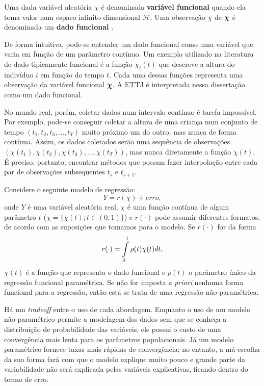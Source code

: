 \documentclass[
	12pt,				%
	openright,			%
	oneside,			%
	a4paper,			%
	english,			%
	brazil				%
	]{dissertacao-ufrgs-abntex2}
\begin{document}
Uma dada variável aleatória $\chi$ é denominada \textbf{variável
funcional }quando ela toma valor num espaco infinito dimensional $\mathcal{H}$.
Uma observação $\chi$ de $\mathcal{\boldsymbol{\chi}}$ é denominada um \textbf{dado
funcional} \cite{vieu_nonparametric_2006}.

De forma intuitiva, pode-se entender um dado funcional como uma variável
que varia em função de um parâmetro contínuo. Um exemplo utilizado
na literatura de dado tipicamente funcional é a função $\chi_{i}(t)$
que descreve a altura do indivíduo $i$ em função do tempo $t$. Cada
uma dessas funções representa uma observação da variável funcional
$\boldsymbol{\chi}$. A ETTJ é interpretada nessa dissertação
como um dado funcional.

No mundo real, porém, coletar dados num intervalo contínuo é tarefa
impossível. Por exemplo, pode-se conseguir coletar a altura de uma
criança num conjunto de tempo $(t_{1},t_{2},t_{3},...,t_{T})$ muito
próximo um do outro, mas nunca de forma contínua. Assim, os dados coletados serão 
uma sequência de observações $(\chi(t_{1}),\chi(t_{2}),\chi(t_{3}),...,\chi(t_{T}))$,
mas nunca diretamente a função $\chi(t)$. É preciso, portanto, encontrar
métodos que possam fazer interpolação entre cada par de
observações subsequentes $t_{s}$ e $t_{s+1}$.

Considere o seguinte modelo de regressão:
\begin{equation}
Y=r(\chi)+erro,\label{eq:modelo_regressao_basica}
\end{equation}
onde $Y$ é uma variável aleatória real, $\chi$ é uma função contínua
de algum parâmetro $t$ ($\chi=\{\chi(t);t\in(0,1)\}$) e $r(\cdot)$
pode assumir diferentes formatos, de acordo com as suposições que
tomamos para o modelo. Se $r(\cdot)$ for da forma
\begin{equation}
r(\cdot)=\intop_{0}^{1}\rho(t)\chi(t)dt,
\end{equation}
$\chi(t)$ é a função que representa o dado funcional e $\rho(t)$
o parâmetro único da regressão funcional paramétrica. Se não for imposta
\emph{a priori} nenhuma forma funcional para a regressão, então esta
se trata de uma regressão não-paramétrica.

Há um \emph{tradeoff} entre o uso de cada abordagem. Enquanto o uso de um
modelo não-paramétrico permite a modelagem dos dados sem que se conheça
a distribuição de probabilidade das variáveis, ele possui o custo
de uma convergência mais lenta para os parâmetros populacionais. Já
um modelo paramétrico fornece taxas mais rápidas de convergência;
no entanto, a má escolha da sua forma fará com que o modelo explique
muito pouco e grande parte da variabilidade não será explicada pelas
variáveis explicativas, ficando dentro do termo de erro.
\end{document}
